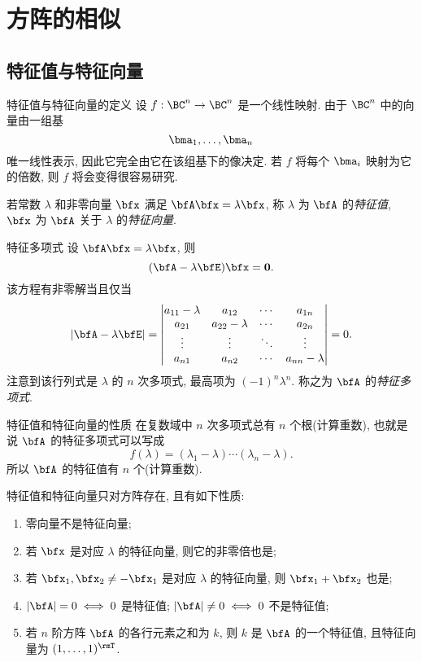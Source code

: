 \section{方阵的相似}

\subsection{特征值与特征向量}

\begin{frame}{特征值与特征向量的定义}
	\onslide<+->
	设 $f:\BC^n\to \BC^n$ 是一个线性映射.
	\onslide<+->
	由于 $\BC^n$ 中的向量由一组基
	\[\bma_1,\dots,\bma_n\]
	唯一线性表示, 因此它完全由它在该组基下的像决定.
	\onslide<+->
	若 $f$ 将每个 $\bma_i$ 映射为它的倍数, 则 $f$ 将会变得很容易研究.

	\onslide<+->
	\begin{definition}
		若常数 $\lambda$ 和非零向量 $\bfx$ 满足 $\bfA\bfx=\lambda\bfx$, 称 $\lambda$ 为 $\bfA$ 的\emph{特征值}, $\bfx$ 为 $\bfA$ 关于 $\lambda$ 的\emph{特征向量}.
	\end{definition}
\end{frame}


\begin{frame}{特征多项式}
	\onslide<+->
	设 $\bfA\bfx=\lambda\bfx$, 则
	\[(\bfA-\lambda\bfE)\bfx={\bf0}.\]
	\onslide<+->
	该方程有非零解当且仅当
	\[|\bfA-\lambda\bfE|=\begin{vmatrix}
		a_{11}-\lambda&a_{12}&\cdots&a_{1n}\\
		a_{21}&a_{22}-\lambda&\cdots&a_{2n}\\
		\vdots&\vdots&\ddots&\vdots\\
		a_{n1}&a_{n2}&\cdots&a_{nn}-\lambda
	\end{vmatrix}=0.\]
	\onslide<+->
	注意到该行列式是 $\lambda$ 的 $n$ 次多项式, 最高项为 $(-1)^n\lambda^n$.
	\onslide<+->
	称之为 $\bfA$ 的\emph{特征多项式}.
\end{frame}


\begin{frame}{特征值和特征向量的性质}
	\onslide<+->
	在复数域中 $n$ 次多项式总有 $n$ 个根(计算重数),
	\onslide<+->
	也就是说 $\bfA$ 的特征多项式可以写成
	\[f(\lambda)=(\lambda_1-\lambda)\cdots(\lambda_n-\lambda).\]
	\onslide<+->
	所以 $\bfA$ 的\alert{特征值有 $n$ 个(计算重数)}.

	\onslide<+->
	特征值和特征向量只对方阵存在, 且有如下性质:
	\begin{enumerate}\bf
		\item 零向量不是特征向量;
		\item 若 $\bfx$ 是对应 $\lambda$ 的特征向量, 则它的非零倍也是;
		\item 若 $\bfx_1,\bfx_2\neq-\bfx_1$ 是对应 $\lambda$ 的特征向量, 则 $\bfx_1+\bfx_2$ 也是;
		\item $|\bfA|=0\iff 0$ 是特征值; $|\bfA|\neq0\iff 0$ 不是特征值;
		\item 若 $n$ 阶方阵 $\bfA$ 的各行元素之和为 $k$, 则 $k$ 是 $\bfA$ 	的一个特征值, 且特征向量为 $(1,\dots,1)^\rmT$.
	\end{enumerate}
\end{frame}


